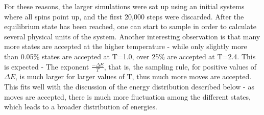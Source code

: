 \documentclass[10pt,a4paper]{article}
\begin{document}
For these reasons, the larger simulations were sat up using an initial systems where all spins point up, and the first 20,000 steps were discarded. 
After the equilibrium state has been reached, one can start to sample in order to calculate several physical units of the system. 
Another interesting observation is that many more states are accepted at the higher temperature - while only slightly more than 0.05\% states are accepted at T=1.0, over 25\% are accepted at T=2.4. This is expected - The exponent $\frac{-\Delta E}{T}$, that is, the sampling rule, for positive values of $\Delta E$, is much larger for larger values of T, thus much more moves are accepted. This fits well with the discussion of the energy distribution described below - as moves are accepted, there is much more fluctuation among the different states, which leads to a broader distribution of energies. 
\end{document}

